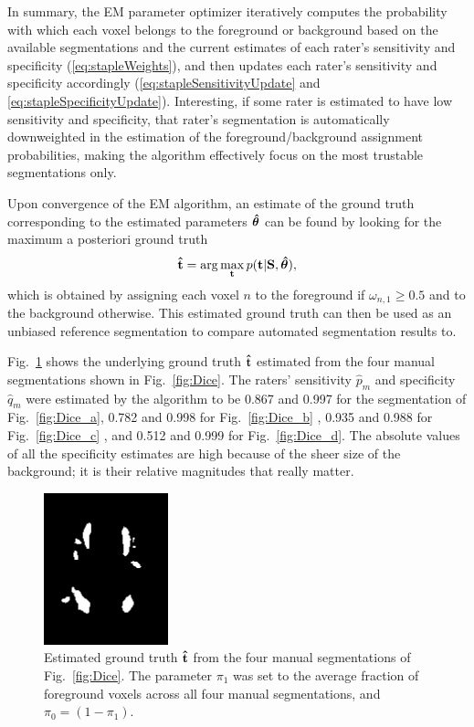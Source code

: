 \documentclass[10pt,twoside]{book}
\begin{document}
In summary, the EM parameter optimizer iteratively computes the probability with which each voxel belongs to the foreground or background based on the available segmentations and the current estimates of each rater's sensitivity and specificity (\eqref{eq:stapleWeights}), and then updates each rater's sensitivity and specificity accordingly (\eqref{eq:stapleSensitivityUpdate} and \eqref{eq:stapleSpecificityUpdate}). Interesting, if some rater is estimated to have low sensitivity and specificity, that rater's segmentation is automatically downweighted in the estimation of the foreground/background assignment probabilities, making the algorithm effectively focus on the most trustable segmentations only.

Upon convergence of the EM algorithm, an estimate of the ground truth corresponding to the estimated parameters ${\mbox{\boldmath {${\hat{\theta}}$}}}$ can be found by looking for the maximum a posteriori ground truth 
\begin{displaymath}
  \mathbf{\hat{t}} = \arg \max_{\mathbf{t}} p( \mathbf{t} | \mathbf{S}, {\mbox{\boldmath {${\hat{\theta}}$}}} ),
\end{displaymath}
which is obtained by assigning each voxel $n$ to the foreground if $\omega_{n,1} \geq 0.5$ and to the background otherwise. This estimated ground truth can then be used as an unbiased reference segmentation to compare automated segmentation results to.

Fig.~\ref{fig:staple} shows the underlying ground truth $\mathbf{\hat{t}}$ estimated from the four manual segmentations shown in Fig.~\ref{fig:Dice}. The raters' sensitivity $\hat{p}_m$ and specificity $\hat{q}_m$ were estimated by the algorithm to be 
0.867 and 0.997 
for the segmentation of Fig.~\ref{fig:Dice_a}, 
0.782 and 0.998
for Fig.~\ref{fig:Dice_b}
, 
0.935 and 0.988
for Fig.~\ref{fig:Dice_c}
, and 
0.512 and 0.999
for Fig.~\ref{fig:Dice_d}.
The absolute values of all the specificity estimates are high because of the sheer size of the background; it is their relative magnitudes that really matter.




\begin{figure}
  \centering
  \includegraphics[width=0.32\textwidth]{stapleEstimatedGroundTruth}
  \caption{Estimated ground truth $\mathbf{\hat{t}}$ from the four manual segmentations of Fig.~\ref{fig:Dice}. The parameter $\pi_1$ was set to the average fraction of foreground voxels across all four manual segmentations, and $\pi_0 = (1-\pi_1)$.}
  \label{fig:staple}
\end{figure}
\end{document}
